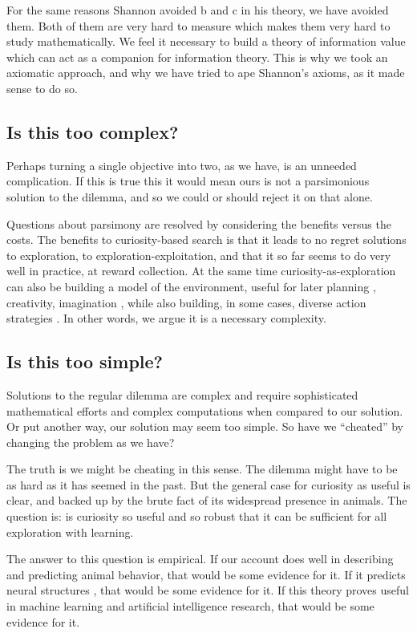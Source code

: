For the same reasons Shannon avoided b and c in his theory, we have avoided them. Both of them are very hard to measure which makes them very hard to study mathematically. We feel it necessary to build a theory of information value which can act as a companion for information theory. This is why we took an axiomatic approach, and why we have tried to ape Shannon's axioms, as it made sense to do so.


\subsection*{Is this too complex?}
Perhaps turning a single objective into two, as we have, is an unneeded complication. If this is true this it would mean ours is not a parsimonious solution to the dilemma, and so we could or should reject it on that alone. 

Questions about parsimony are resolved by considering the benefits versus the costs. The benefits to curiosity-based search is that it leads to no regret solutions to exploration, to exploration-exploitation, and that it so far seems to do very well in practice, at reward collection. At the same time curiosity-as-exploration can also be building a model of the environment, useful for later planning \cite{Ahilan2019,Poucet1993}, creativity, imagination \cite{Schmidhuber2010}, while also building, in some cases, diverse action strategies \cite{Lehman2011a,Lehman2013,Mouret2015,Colas2020}. In other words, we argue it is a necessary complexity. 


\subsection*{Is this too simple?}
Solutions to the regular dilemma are complex and require sophisticated mathematical efforts and complex computations when compared to our solution. Or put another way, our solution may seem too simple. So have we ``cheated'' by changing the problem as we have?

The truth is we might be cheating in this sense. The dilemma might have to be as hard as it has seemed in the past. But the general case for curiosity as useful is clear, and backed up by the brute fact of its widespread presence in animals. The question is: is curiosity so useful and so robust that it can be sufficient for all exploration with learning. 

The answer to this question is empirical. If our account does well in describing and predicting animal behavior, that would be some evidence for it. If it predicts neural structures \cite{Cisek2019}, that would be some evidence for it. If this theory proves useful in machine learning and artificial intelligence research, that would be some evidence for it.


